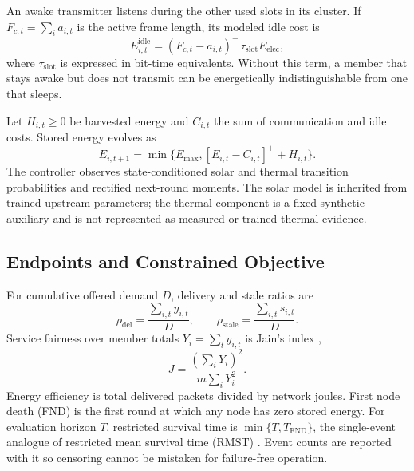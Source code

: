 \documentclass[journal]{IEEEtran}
\begin{document}
An awake transmitter listens during the other used slots in its cluster. If
$F_{c,t}=\sum_i a_{i,t}$ is the active frame length, its modeled idle cost is
\begin{equation}
 E^{\mathrm{idle}}_{i,t}=
 (F_{c,t}-a_{i,t})^{+}\,\tau_{\mathrm{slot}}E_{\mathrm{elec}},
 \label{eq:idle}
\end{equation}
where $\tau_{\mathrm{slot}}$ is expressed in bit-time equivalents. Without
this term, a member that stays awake but does not transmit can be energetically
indistinguishable from one that sleeps.

Let $H_{i,t}\ge0$ be harvested energy and $C_{i,t}$ the sum of communication
and idle costs. Stored energy evolves as
\begin{equation}
 E_{i,t+1}=\min\{E_{\max},[E_{i,t}-C_{i,t}]^{+}+H_{i,t}\}.
 \label{eq:battery}
\end{equation}
The controller observes state-conditioned solar and thermal transition
probabilities and rectified next-round moments. The solar model is inherited
from trained upstream parameters; the thermal component is a fixed synthetic
auxiliary and is not represented as measured or trained thermal evidence.

\subsection{Endpoints and Constrained Objective}

For cumulative offered demand $D$, delivery and stale ratios are
\begin{equation}
 \rho_{\mathrm{del}}=\frac{\sum_{i,t}y_{i,t}}{D},\qquad
 \rho_{\mathrm{stale}}=\frac{\sum_{i,t}s_{i,t}}{D}.
 \label{eq:qos}
\end{equation}
Service fairness over member totals $Y_i=\sum_t y_{i,t}$ is Jain's index
\cite{jain1984fairness},
\begin{equation}
 J=\frac{(\sum_iY_i)^2}{m\sum_iY_i^2}.
 \label{eq:jain}
\end{equation}
Energy efficiency is total delivered packets divided by network joules. First
node death (FND) is the first round at which any node has zero stored energy.
For evaluation horizon $T$, restricted survival time is
$\min\{T,T_{\mathrm{FND}}\}$, the single-event analogue of restricted mean
survival time (RMST) \cite{uno2014rmst}. Event counts are reported with it so
censoring cannot be mistaken for failure-free operation.
\end{document}
